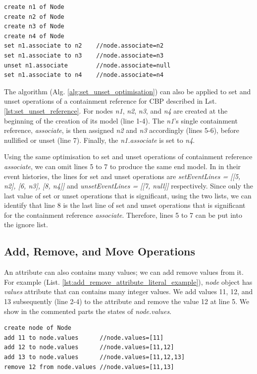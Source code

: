 \documentclass[sigconf]{acmart}
\begin{document}
\begin{lstlisting}[style=eol,caption={Example of CBP representation of \emph{name} reference assignments.},label=lst:set_unset_reference]
create n1 of Node
create n2 of Node
create n3 of Node
create n4 of Node
set n1.associate to n2    //node.associate=n2
set n1.associate to n3    //node.associate=n3
unset n1.associate        //node.associate=null
set n1.associate to n4    //node.associate=n4
\end{lstlisting}

The algorithm (Alg. \ref{alg:set_unset_optimisation}) can also be applied to set and unset operations of a containment reference for CBP described in Lst. \ref{lst:set_unset_reference}. For nodes \emph{n1}, \emph{n2}, \emph{n3}, and \emph{n4} are created at the beginning of the creation of its model (line 1-4). The \emph{n1}'s single containment reference, \emph{associate}, is then assigned \emph{n2} and \emph{n3} accordingly (lines 5-6), before nullified or unset (line 7). Finally, the \emph{n1.associate} is set to \emph{n4}. 

Using the same optimisation to set and unset operations of containment reference \emph{associate}, we can omit lines 5 to 7 to produce the same end model. In in their event histories, the lines for set and unset operations are \emph{setEventLines = [[5, n2], [6, n3], [8, n4]]} and \emph{unsetEventLines = [[7, null]]} respectively. Since only the last value of set or unset operations that is significant, using the two lists, we can identify that line 8 is the last line of set and unset operations that is significant for the containment reference \emph{associate}. Therefore, lines 5 to 7 can be put into the ignore list.

\subsection{Add, Remove, and Move Operations}
\label{subsec:add_remove_and_move_operations}
An attribute can also contains many values; we can add remove values from it. For example (List. \ref{lst:add_remove_attribute_literal_example}), \emph{node} object has \emph{values} attribute that can contains many integer values. We add values 11, 12, and 13 subsequently (line 2-4) to the attribute and remove the value 12 at line 5. We show in the commented parts the states of \emph{node.values}.  

\begin{lstlisting}[style=eol,caption={Example of CBP representation of attribute \emph{values}'s add and remove operations.},label=lst:add_remove_move_attribute]
create node of Node
add 11 to node.values      //node.values=[11] 
add 12 to node.values      //node.values=[11,12] 
add 13 to node.values      //node.values=[11,12,13] 
remove 12 from node.values //node.values=[11,13] 
\end{lstlisting}
\end{document}
